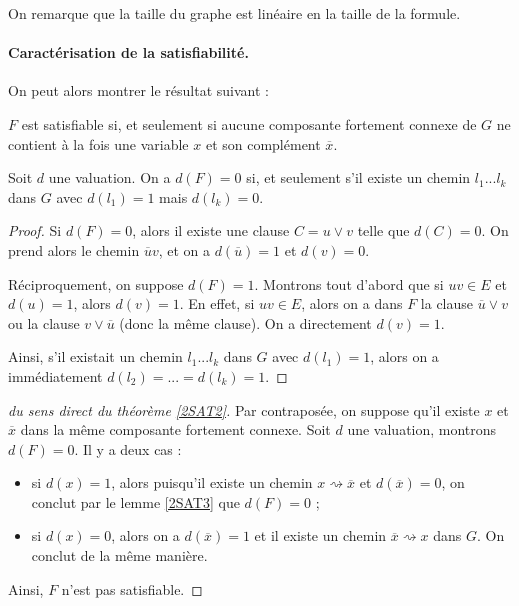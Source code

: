 \begin{rem}On remarque que la taille du graphe est linéaire en la taille de la formule.
\end{rem}


\paragraph{Caractérisation de la satisfiabilité.} On peut alors montrer le résultat suivant :

\begin{theorem}\label{2SAT2}
$F$ est satisfiable si, et seulement si aucune composante fortement connexe de $G$ ne contient à la fois une variable $x$ et son complément $\overline{x}$.
\end{theorem}

\begin{lemma}\label{2SAT3}
Soit $d$ une valuation. On a $d(F)=0$ si, et seulement s'il existe un chemin $l_1...l_k$ dans $G$ avec $d(l_1)=1$ mais $d(l_k)=0$.
\end{lemma}

\begin{proof}
Si $d(F)=0$, alors il existe une clause $C=u \vee v$ telle que $d(C)=0$. On prend alors le chemin $\overline{u}v$, et on a $d(\overline{u})=1$ et $d(v)=0$.

Réciproquement, on suppose $d( F)=1$. Montrons tout d'abord que si $uv\in E$ et $d(u)=1$, alors $d(v)=1$. En effet, si $uv\in E$, alors on a dans $F$ la clause $\overline{u}\vee v$ ou la clause $v \vee \overline{u}$ (donc la même clause).  On a directement $d(v)=1$.

Ainsi, s'il existait un chemin $l_1...l_k$ dans $G$ avec $d(l_1)=1$, alors on a immédiatement $d(l_2)=...=d(l_k)=1$.
\end{proof}


\begin{proof}[ du sens direct du théorème \ref{2SAT2}]
Par contraposée, on suppose qu'il existe $x$ et $\overline{x}$ dans la même composante fortement connexe. Soit $d$ une valuation, montrons $d(F)=0$. Il y a deux cas :
\begin{itemize}
\item si $d(x)=1$, alors puisqu'il existe un chemin $x\rightsquigarrow \overline{x}$ et $d(\overline{x})=0$, on conclut par le lemme \ref{2SAT3} que $d(F)=0$ ;
\item si $d(x)=0$, alors on a $d(\overline{x})=1$ et il existe un chemin $\overline{x} \rightsquigarrow x$ dans $G$. On conclut de la même manière.
\end{itemize}
Ainsi, $F$ n'est pas satisfiable.
\end{proof}


